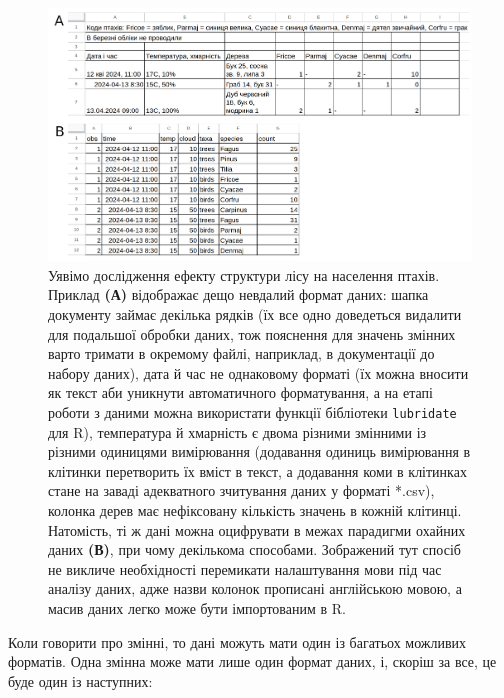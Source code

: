\documentclass[
  11pt,
]{book}
\begin{document}
\begin{figure}
\centering
\includegraphics{images/tidydata.png}
\caption{\label{fig:fig-3-14}Уявімо дослідження ефекту структури лісу на населення птахів. Приклад \textbf{(А)} відображає дещо невдалий формат даних: шапка документу займає декілька рядків (їх все одно доведеться видалити для подальшої обробки даних, тож пояснення для значень змінних варто тримати в окремому файлі, наприклад, в документації до набору даних), дата й час не однаковому форматі (їх можна вносити як текст аби уникнути автоматичного форматування, а на етапі роботи з даними можна використати функції бібліотеки \texttt{lubridate} для R), температура й хмарність є двома різними змінними із різними одиницями вимірювання (додавання одиниць вимірювання в клітинки перетворить їх вміст в текст, а додавання коми в клітинках стане на заваді адекватного зчитування даних у форматі *.csv), колонка дерев має нефіксовану кількість значень в кожній клітинці. Натомість, ті ж дані можна оцифрувати в межах парадигми охайних даних \textbf{(В)}, при чому декількома способами. Зображений тут спосіб не викличе необхідності перемикати налаштування мови під час аналізу даних, адже назви колонок прописані англійською мовою, а масив даних легко може бути імпортованим в R.}
\end{figure}

Коли говорити про змінні, то дані можуть мати один із багатьох можливих форматів. Одна змінна може мати лише один формат даних, і, скоріш за все, це буде один із наступних:
\end{document}
